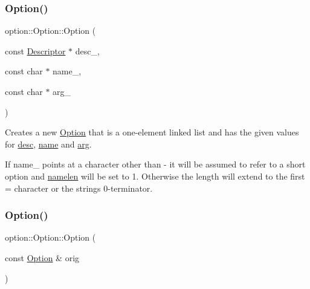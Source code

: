 \subsubsection{\texorpdfstring{Option()}{Option()}\hspace{0.1cm}{\footnotesize\ttfamily [1/2]}}
{\footnotesize\ttfamily option\+::\+Option\+::\+Option (\begin{DoxyParamCaption}\item[{const \hyperlink{structoption_1_1_descriptor}{Descriptor} $\ast$}]{desc\+\_\+,  }\item[{const char $\ast$}]{name\+\_\+,  }\item[{const char $\ast$}]{arg\+\_\+ }\end{DoxyParamCaption})\hspace{0.3cm}{\ttfamily [inline]}}



Creates a new \hyperlink{classoption_1_1_option}{Option} that is a one-\/element linked list and has the given values for \hyperlink{classoption_1_1_option_af8d664a7b5de1425008b1812a90a0c23}{desc}, \hyperlink{classoption_1_1_option_a02a76b4896abd22d0ba8514362261de9}{name} and \hyperlink{classoption_1_1_option_a402be734987458364b0f473acae36238}{arg}. 

If {\ttfamily name\+\_\+} points at a character other than \textquotesingle{}-\/\textquotesingle{} it will be assumed to refer to a short option and \hyperlink{classoption_1_1_option_a3aa2957b19ad5815873441b415d56050}{namelen} will be set to 1. Otherwise the length will extend to the first \textquotesingle{}=\textquotesingle{} character or the string\textquotesingle{}s 0-\/terminator. \mbox{\label{classoption_1_1_option_a4053240fecad1a3b1d8e4dc06b7aa8c4}} 
\subsubsection{\texorpdfstring{Option()}{Option()}\hspace{0.1cm}{\footnotesize\ttfamily [2/2]}}
{\footnotesize\ttfamily option\+::\+Option\+::\+Option (\begin{DoxyParamCaption}\item[{const \hyperlink{classoption_1_1_option}{Option} \&}]{orig }\end{DoxyParamCaption})\hspace{0.3cm}{\ttfamily [inline]}}



